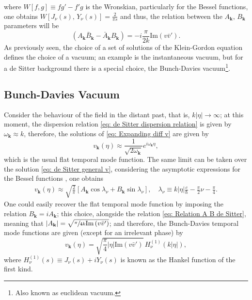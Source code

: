 where $W[f,g]\equiv fg'-f'g$ is the Wronskian, particularly \cite[\href{https://dlmf.nist.gov/10.5}{10.5.2}]{DLMF} for the Bessel functions, one obtains $W\left[J_\nu\left(s\right),\,Y_\nu\left(s\right)\right]=\frac{2}{\pi s}$
and thus, the relation between the  $A_\mathbf{k},\,B_\mathbf{k}$ parameters will be
\begin{equation}\label{eq: Relation A B de Sitter}
	\left(A_\mathbf{k}\bar{B}_\mathbf{k}-\bar{A}_\mathbf{k}B_\mathbf{k}\right)=-i\frac{\pi}{2k}\text{Im}\left(v\bar{v}'\right).
\end{equation}
As previously seen, the choice of a set of solutions of the Klein-Gordon equation defines the choice of a vacuum; an example is the instantaneous vacuum, but for a de Sitter background there is a special choice, the Bunch-Davies vacuum\footnote{Also known as euclidean vacuum.}.
\subsection{Bunch-Davies Vacuum}
Consider the behaviour of the field in the distant past, that is, $k|\eta|\to\infty$; at this moment, the dispersion relation \ref{eq: de Sitter dispersion relation} is given by $\omega_\mathbf{k}\approx k$, therefore, the solutions of \ref{eq: Expanding diff v} are given by
\begin{equation}
	v_\mathbf{k}(\eta)\approx \frac{1}{\sqrt{2\omega_\mathbf{k}}}e^{i\omega_\mathbf{k}\eta},
\end{equation}
which is the usual flat temporal mode function. The same limit can be taken over the solution \ref{eq: de Sitter general v}, 
considering the asymptotic expressions for the Bessel functions \cite[\href{https://dlmf.nist.gov/10.7}{10.7.8}]{DLMF}, one obtains
\begin{subequations}
	\begin{gather}
		v_\mathbf{k}(\eta)\approx \sqrt{\frac{2}{\pi}}\left[A_\mathbf{k}\cos\lambda_\nu+B_\mathbf{k}\sin\lambda_\nu\right],\quad \lambda_\nu\equiv k|\eta|\frac{c}{\hbar}-\frac{\pi}{2}\nu-\frac{\pi}{4}.\tag{\theequation \,\,a,b}
	\end{gather}
\end{subequations}
One could easily recover the flat temporal mode function by imposing the relation 
$B_\mathbf{k}=iA_\mathbf{k}$; this choice, alongside the relation \ref{eq: Relation A B de Sitter}, meaning that  $|A_\mathbf{k}|=\sqrt{\sfrac{\pi}{4 k}\text{Im}\left(v\bar{v}'\right)}$; and therefore, the Bunch-Davies temporal mode functions are given (except for an irrelevant phase) by
\begin{equation}
	v_\mathbf{k}(\eta)=\sqrt{\frac{\pi}{4 }|\eta|\text{Im}\left(v\bar{v}'\right)}\,H^{(1)}_\nu\left(k|\eta|\right),
\end{equation}
where $H^{(1)}_\nu(s)\equiv J_\nu(s)+iY_\nu(s)$ is known as the Hankel function of the first kind.

